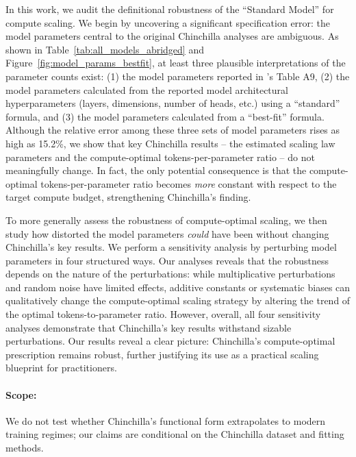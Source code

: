 In this work, we audit the definitional robustness of the ``Standard Model'' for compute scaling. We begin by uncovering a significant specification error: the model parameters central to the original Chinchilla analyses are ambiguous. As shown in Table~\ref{tab:all_models_abridged} and Figure~\ref{fig:model_params_bestfit}, at least three plausible interpretations of the parameter counts exist:
(1) the model parameters reported in \citet{hoffman2022chinchilla}'s Table A9, (2) the model parameters calculated from the reported model architectural hyperparameters (layers, dimensions, number of heads, etc.) using a ``standard'' formula, and (3) the model parameters calculated from a ``best-fit'' formula.
Although the relative error among these three sets of model parameters rises as high as 15.2\%, we show that key Chinchilla results -- the estimated scaling law parameters and the compute-optimal tokens-per-parameter ratio -- do not meaningfully change. 
In fact, the only potential consequence is that the compute-optimal tokens-per-parameter ratio becomes \textit{more} constant with respect to the target compute budget, strengthening Chinchilla's finding. 

To more generally assess the robustness of compute-optimal scaling, we then study how distorted the model parameters \textit{could} have been without changing Chinchilla's key results.
We perform a sensitivity analysis by perturbing model parameters in four structured ways. 
Our analyses reveals that the robustness depends on the nature of the perturbations: while multiplicative perturbations and random noise have limited effects, additive constants or systematic biases can qualitatively change the compute-optimal scaling strategy by altering the trend of the optimal tokens-to-parameter ratio.
However, overall, all four sensitivity analyses demonstrate that Chinchilla's key results withstand sizable perturbations.
Our results reveal a clear picture: Chinchilla’s compute-optimal prescription remains robust, further justifying its use as a practical scaling blueprint for practitioners.

\noindent\paragraph{Scope:} We do not test whether Chinchilla's functional form extrapolates to modern training regimes; our claims are conditional on the Chinchilla dataset and fitting methods.


